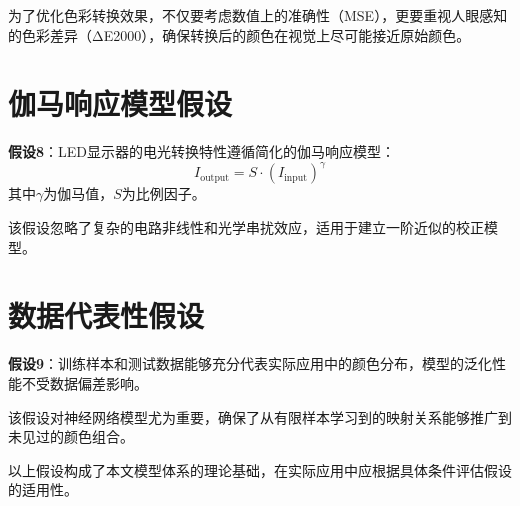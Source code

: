 为了优化色彩转换效果，不仅要考虑数值上的准确性（MSE），更要重视人眼感知的色彩差异（ΔE2000），确保转换后的颜色在视觉上尽可能接近原始颜色。

\section[\hspace{-2pt}伽马响应模型假设]{{\heiti{} \hspace{-8pt}伽马响应模型假设}}\label{section2: 伽马响应模型假设}

\textbf{假设8}：LED显示器的电光转换特性遵循简化的伽马响应模型：
$$I_{\text{output}} = S \cdot (I_{\text{input}})^{\gamma}$$
其中$\gamma$为伽马值，$S$为比例因子。

该假设忽略了复杂的电路非线性和光学串扰效应，适用于建立一阶近似的校正模型。

\section[\hspace{-2pt}数据代表性假设]{{\heiti{} \hspace{-8pt}数据代表性假设}}\label{section2: 数据代表性假设}

\textbf{假设9}：训练样本和测试数据能够充分代表实际应用中的颜色分布，模型的泛化性能不受数据偏差影响。

该假设对神经网络模型尤为重要，确保了从有限样本学习到的映射关系能够推广到未见过的颜色组合。

以上假设构成了本文模型体系的理论基础，在实际应用中应根据具体条件评估假设的适用性。

